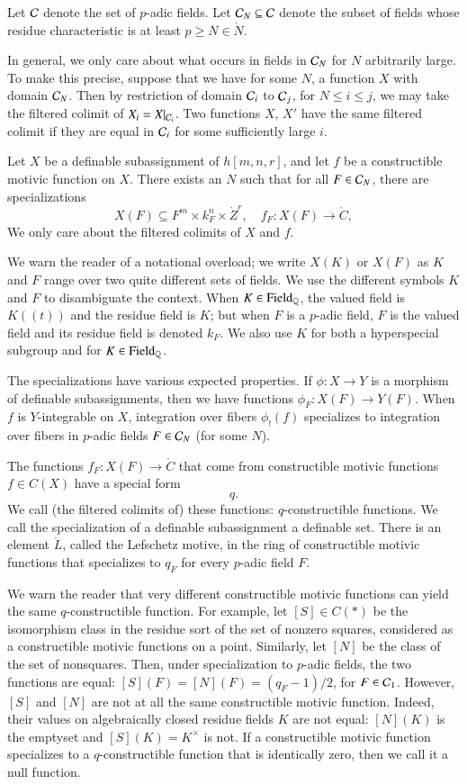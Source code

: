 Let $\mathcal C$ denote the set of $p$-adic fields.
Let $\mathcal C_N\subseteq \mathcal C$ denote the subset of fields whose residue characteristic is at least $p\ge N\in\ring{N}$.

In general, we only care about what occurs in fields in $\mathcal C_N$ for $N$ arbitrarily large.
To make this precise, suppose that we have for some $N$, a function $X$ with domain $\mathcal C_N$.
Then by restriction of domain $\mathcal C_i$ to $\mathcal C_{j}$, for $N\le i\le j$, we may take the filtered colimit of $X_i=X|_{\mathcal C_i}$.
Two functions $X$, $X'$ have the same filtered colimit if they are equal in $\mathcal C_i$ for some sufficiently large $i$.

Let $X$ be a definable subassignment of $h[m,n,r]$, and let $f$ be a constructible motivic function on $X$.   There exists
an $N$ such that for all $F\in \mathcal C_N$, there are specializations
\[
X(F)\subseteq F^m\times k_F^n\times \ring{Z}^r,  \quad f_F: X(F) \to\ring{C},
\]
We only care about the  filtered colimits of $X$ and $f$.

We warn the reader of a notational overload; we write $X(K)$ or $X(F)$ as $K$ and $F$ range over two quite different
sets of fields.  We use the different symbols $K$ and $F$  to disambiguate the context.
When $K\in {\operatorname{Field}}_{\mathbb{Q}}$, the valued field is $K((t))$ and the residue field is $K$; but when $F$ is a $p$-adic field, $F$
is the valued field and its residue field is denoted $k_F$.  We also use $K$ for both a hyperspecial subgroup and for $K\in{\operatorname{Field}}_{\mathbb{Q}}$.

The specializations have various expected properties.
If $\phi:X\to Y$ is a morphism of definable subassignments, then we have functions $\phi_F:X(F)\to Y(F)$.
When $f$ is $Y$-integrable on $X$,  integration over fibers $\phi_!(f)$ specializes to integration over fibers in
 $p$-adic fields $F\in \mathcal C_N$ (for some $N$).


The functions $f_F:X(F)\to\ring{C}$ that come from constructible motivic functions  $f\in C(X)$ have a special form
\[
q.
\]
We call (the filtered colimits of) these functions:  $q$-constructible functions.  
We  call the specialization of a  definable subassignment a definable set.  
There is an element $\ring{L}$, called the Lefschetz motive, in the ring of constructible motivic functions that specializes to $q_F$
for every $p$-adic field $F$.

We warn the reader that
very different constructible motivic functions can yield the same $q$-constructible function.  For example,
let $[S]\in C(*)$ be the isomorphism class in the residue sort of the set of nonzero squares, considered as a 
constructible motivic functions on a point.  Similarly, let $[N]$ be the class of the set of nonsquares.  Then, under specialization
to $p$-adic fields, the
two functions are equal:
$[S](F) = [N](F) = (q_F-1)/2$, for $F\in\mathcal C_1$. However, $[S]$ and $[N]$ are not at all the same constructible motivic function. Indeed,  their values on 
algebraically closed residue fields $K$ are not equal: $[N](K)$ is the emptyset and $[S](K) = K^\times$ is not.
If a constructible motivic function specializes to a $q$-constructible function that is identically zero, then we call
it a null function.


